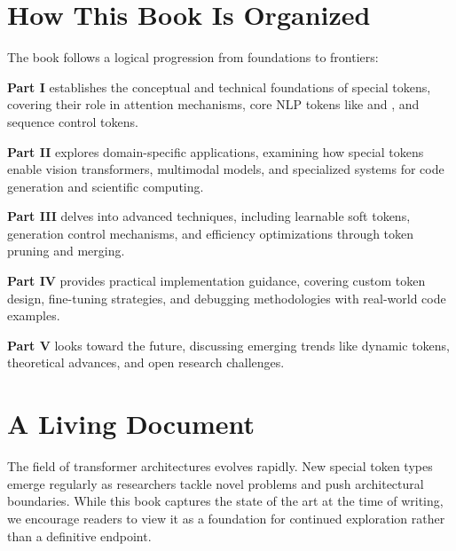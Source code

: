 \section*{How This Book Is Organized}

The book follows a logical progression from foundations to frontiers:

\textbf{Part I} establishes the conceptual and technical foundations of special tokens, covering their role in attention mechanisms, core NLP tokens like \cls{} and \mask{}, and sequence control tokens.

\textbf{Part II} explores domain-specific applications, examining how special tokens enable vision transformers, multimodal models, and specialized systems for code generation and scientific computing.

\textbf{Part III} delves into advanced techniques, including learnable soft tokens, generation control mechanisms, and efficiency optimizations through token pruning and merging.
\begin{comment}
Feedback: The description for Part III is a bit vague with "learnable soft tokens, generation control mechanisms". Can you be more specific? For example: "...delves into advanced techniques, such as using special tokens to steer text generation, implementing learnable 'soft prompts' for parameter-efficient fine-tuning, and optimizing inference speed through token pruning and merging."
\end{comment}

\textbf{Part IV} provides practical implementation guidance, covering custom token design, fine-tuning strategies, and debugging methodologies with real-world code examples.

\textbf{Part V} looks toward the future, discussing emerging trends like dynamic tokens, theoretical advances, and open research challenges.

\section*{A Living Document}

The field of transformer architectures evolves rapidly. New special token types emerge regularly as researchers tackle novel problems and push architectural boundaries. While this book captures the state of the art at the time of writing, we encourage readers to view it as a foundation for continued exploration rather than a definitive endpoint.
\begin{comment}
Feedback: This is a standard disclaimer. To make it more engaging, you could invite the reader to participate. For example: "We invite readers to join the conversation on the book's accompanying GitHub repository, where we will post updates and discuss new developments in the field." This turns a static statement into an active invitation.
\end{comment}

